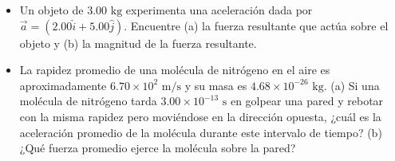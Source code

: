 \documentclass[11pt,a4paper]{article}
\begin{document}
\begin{itemize}
    \item[\textbf{3.}] Un objeto de $3.00 \text{ kg}$ experimenta una aceleración dada por $\vec{a} = (2.00\hat{i} + 5.00\hat{j})$. Encuentre (a) la fuerza resultante que actúa sobre el objeto y (b) la magnitud de la fuerza resultante.
    \vspace*{6cm}

    \item[\textbf{4.}] La rapidez promedio de una molécula de nitrógeno en el aire es aproximadamente $6.70 \times 10^2 \text{ m/s}$ y su masa es $4.68 \times 10^{-26} \text{ kg}$. (a) Si una molécula de nitrógeno tarda $3.00 \times 10^{-13} \text{ s}$ en golpear una pared y rebotar con la misma rapidez pero moviéndose en la dirección opuesta, ¿cuál es la aceleración promedio de la molécula durante este intervalo de tiempo? (b) ¿Qué fuerza promedio ejerce la molécula sobre la pared?
    \vspace*{6cm}
\end{itemize}

\newpage
\end{document}
